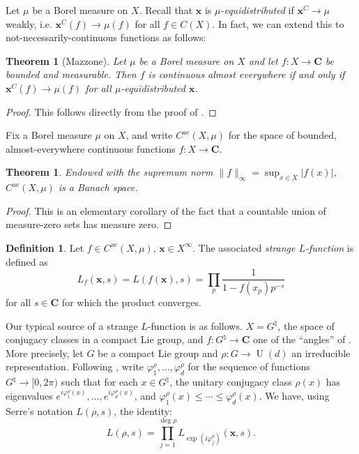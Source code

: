 \documentclass{article}
\DeclareMathOperator{\U}{U}
\newcommand{\bC}{\mathbf{C}}
\newcommand{\bx}{\boldsymbol{x}}
\newcommand{\alev}{\mathrm{ae}}
\newtheorem{theorem}[subsection]{Theorem}
\theoremstyle{definition}
\newtheorem{definition}[subsection]{Definition}
\begin{document}
Let $\mu$ be a Borel measure on $X$. Recall that $\bx$ is 
\emph{$\mu$-equidistributed} if $\bx^C\to \mu$ weakly, i.e. 
$\bx^C(f) \to \mu(f)$ for all $f\in C(X)$. In fact, we can extend this to 
not-necessarily-continuous functions as follows:

\begin{theorem}[Mazzone]
Let $\mu$ be a Borel measure on $X$ and let $f\colon X\to \bC$ be bounded and 
measurable. Then $f$ is continuous almost everywhere if and only if 
$\bx^C(f) \to \mu(f)$ for all $\mu$-equidistributed $\bx$. 
\end{theorem}
\begin{proof}
This follows directly from the proof of \cite[Th.~1]{mazzone-1995}.
\end{proof}

Fix a Borel measure $\mu$ on $X$, and write $C^\alev(X,\mu)$ for the space of 
bounded, almost-everywhere continuous functions $f\colon X\to \bC$. 


\begin{theorem}
Endowed with the supremum norm $\|f\|_\infty=\sup_{x\in X} |f(x)|$, 
$C^\alev(X,\mu)$ is a Banach space. 
\end{theorem}
\begin{proof}
This is an elementary corollary of the fact that a countable union of 
measure-zero sets has measure zero. 
\end{proof}

\begin{definition}
Let $f\in C^\alev(X,\mu)$, $\bx\in X^\infty$. The associated \emph{strange 
$L$-function} is defined as 
\[
	L_f(\bx,s) = L(f(\bx),s) = \prod_p \frac{1}{1-f(x_p) p^{-s}} 
\]
for all $s\in \bC$ for which the product converges. 
\end{definition}

Our typical source of a strange $L$-function is as follows. $X=G^\natural$, the 
space of conjugacy classes in a compact Lie group, and 
$f\colon G^\natural\to \bC$ one of the ``angles'' of \cite{katz-sarnak-1999}. 
More precisely, let $G$ be a compact Lie group and $\rho\colon G\to \U(d)$ an 
irreducible representation. Following \cite[Le.~1.0.9]{katz-sarnak-1999}, write 
$\varphi_1^\rho,\dots,\varphi_d^\rho$ for the sequence of functions 
$G^\natural\to [0,2\pi)$ such that for each $x\in G^\natural$, the unitary 
conjugacy class $\rho(x)$ has eigenvalues 
$e^{i\varphi_1^\rho(x)},\dots,e^{i \varphi_d^\rho(x)}$, and 
$\varphi_1^\rho(x) \leqslant \cdots \leqslant \varphi_d^\rho(x)$. We have, 
using Serre's notation $L(\rho,s)$, the identity:
\[
	L(\rho,s) = \prod_{j=1}^{\deg\rho} L_{\exp(i\varphi_j^\rho)}(\bx,s) .
\]
\end{document}
